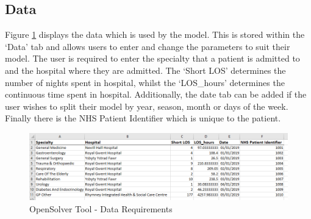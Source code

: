 \documentclass[../thesis.tex]{subfiles}
\begin{document}
\subsection*{Data}
Figure \ref{fig:exdata} displays the data which is used by the model. This is stored within the `Data' tab and allows users to enter and change the parameters to suit their model. The user is required to enter the specialty that a patient is admitted to and the hospital where they are admitted. The `Short LOS' determines the number of nights spent in hospital, whilst the `LOS\_hours' determines the continuous time spent in hospital. Additionally, the date tab can be added if the user wishes to split their model by year, season, month or days of the week. Finally there is the NHS Patient Identifier which is unique to the patient.

\begin{figure}[h!]
    \centering
    \includegraphics[width=\textwidth]{Chapters/Chapter7/Figures/Data.png}
    \caption{OpenSolver Tool - Data Requirements}
    \label{fig:exdata}
\end{figure}

\end{document}
